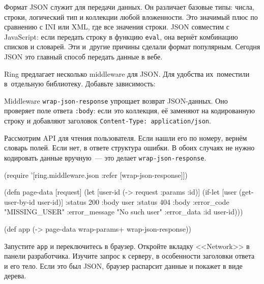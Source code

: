 
Формат JSON служит для передачи данных. Он различает базовые типы: числа,
строки, логический тип и коллекции любой вложенности. Это значимый плюс по
сравнению с INI или XML, где все значения строки. JSON совместим с JavaScript:
если передать строку в функцию \verb|eval|, она вернёт комбинацию списков
и словарей. Эти и~другие причины сделали формат популярным. Сегодня JSON это
главный способ передать данные в вебе.

Ring предлагает несколько middleware для JSON. Для удобства их~поместили
в~отдельную библиотеку. Добавьте зависимость:

\begin{english}
  \begin{clojure}
  \end{clojure}
\end{english}


Middleware \verb|wrap-json-response| упрощает возврат JSON-данных. Оно
проверяет поле ответа \verb|:body|: если это коллекция, её заменяют на
кодированную строку и добавляют заголовок \verb|Content-Type: application/json|.

Рассмотрим API для чтения пользователя. Если нашли его по номеру, вернём
словарь полей. Если нет, в ответе структура ошибки. В обоих случаях не нужно
кодировать данные вручную~--- это делает \verb|wrap-json-response|.

\begin{english}
  \begin{clojure}
(require '[ring.middleware.json
           :refer [wrap-json-response]])

(defn page-data [request]
  (let [user-id (-> request :params :id)]
    (if-let [user (get-user-by-id user-id)]
      {:status 200 :body user}
      {:status 404
       :body {:error_code "MISSING_USER"
              :error_message "No such user"
              :error_data {:id user-id}}})))

(def app (-> page-data
             wrap-params+
             wrap-json-response))
  \end{clojure}
\end{english}

Запустите \verb|app| и переключитесь в браузер. Откройте вкладку <<Network>> в
панели разработчика. Изучите запрос к серверу, в особенности заголовки ответа и
его тело. Если это был JSON, браузер распарсит данные и покажет в виде дерева.

